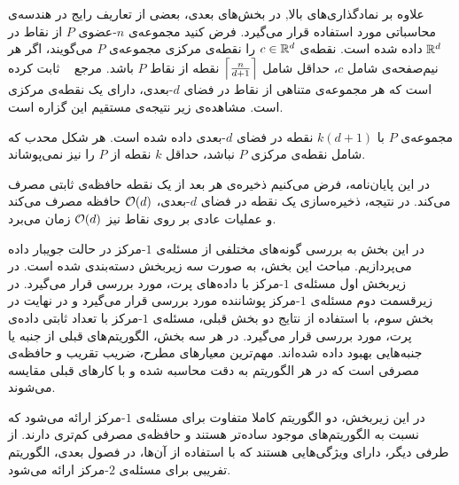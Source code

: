  

علاوه بر نمادگذاری‌های بالا, در بخش‌های بعدی، بعضی از تعاریف رایج در هندسه‌ی محاسباتی مورد استفاده قرار می‌گیرد. فرض کنید مجموعه‌ی $n$-عضوی $P$ از نقاط در $\mathbb{R}^d$ داده شده است. نقطه‌ی $c \in \mathbb{R}^d$ را نقطه‌ی مرکزی مجموعه‌ی $P$ می‌گویند، اگر هر نیم‌صفحه‌ی شامل $c$، حداقل شامل $\left\lceil{\frac{n}{d+1}}\right\rceil$ نقطه از نقاط $P$ باشد. مرجع ~ ثابت کرده است که هر مجموعه‌ی متناهی از نقاط در فضای $d$-بعدی، دارای یک نقطه‌ی مرکزی است. مشاهده‌ی زیر نتیجه‌ی مستقیم این گزاره است.

مجموعه‌ی $P$ با $k(d+1)$ نقطه در فضای $d$-بعدی داده شده است. هر شکل محدب که شامل نقطه‌ی مرکزی $P$ نباشد، حداقل $k$ نقطه‌ از $P$ را نیز نمی‌پوشاند.


در این پایان‌نامه، فرض می‌کنیم ذخیره‌ی هر بعد از یک نقطه‌ حافظه‌ی ثابتی مصرف می‌کند. در نتیجه، ذخیره‌سازی یک نقطه در فضای $d$-بعدی، $\mathcal{O}(d)$ حافظه مصرف می‌کند و عملیات عادی بر روی نقاط نیز‌ $\mathcal{O}(d)$ زمان می‌برد.


در این بخش به بررسی گونه‌های مختلفی از مسئله‌ی $1$-مرکز در حالت جویبار داده می‌پردازیم. مباحث این بخش، به صورت سه زیربخش دسته‌بندی شده است. در زیربخش اول مسئله‌ی $1$-مرکز با داده‌های پرت، مورد بررسی قرار می‌گیرد. در زیرقسمت دوم مسئله‌ی $1$-مرکز پوشاننده مورد بررسی قرار می‌گیرد و در نهایت در بخش سوم، با استفاده از نتایج دو بخش قبلی، مسئله‌ی $1$-مرکز با تعداد ثابتی داده‌ی پرت، مورد بررسی قرار می‌گیرد. در هر سه بخش‌، الگوریتم‌های قبلی از جنبه‌ یا جنبه‌هایی بهبود داده شده‌اند. مهم‌ترین معیار‌های مطرح، ضریب تقریب و حافظه‌ی مصرفی است که در هر الگوریتم به دقت محاسبه شده‌ و با کارهای قبلی مقایسه می‌شوند.


در این زیربخش، دو الگوریتم کاملا متفاوت برای مسئله‌ی $1$-مرکز‌ ارائه می‌شود که نسبت به الگوریتم‌های موجود ساده‌تر هستند و حافظه‌ی مصرفی کم‌تری دارند. از طرفی دیگر، دارای ویژگی‌هایی هستند که با استفاده از آن‌ها، در فصول بعدی، الگوریتم تفریبی برای مسئله‌ی $2$-مرکز ارائه می‌شود.

